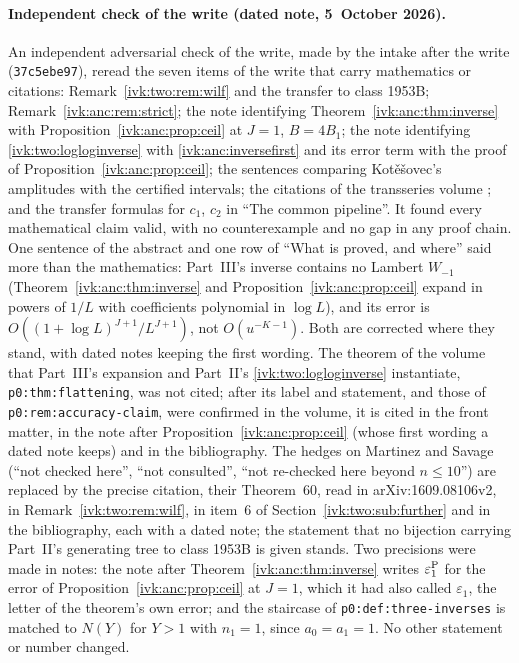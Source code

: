 \documentclass[11pt,letterpaper]{article}
\theoremstyle{remark}\newtheorem{remark}[theorem]{Remark}
\newcommand{\eps}{\varepsilon}
\begin{document}
\paragraph{Independent check of the write (dated note, 5~October 2026).}
An independent adversarial check of the write, made by the intake after the write (\texttt{37c5ebe97}), reread the seven items of the write that carry mathematics or citations: Remark~\ref{ivk:two:rem:wilf} and the transfer to class 1953B; Remark~\ref{ivk:anc:rem:strict}; the note identifying Theorem~\ref{ivk:anc:thm:inverse} with Proposition~\ref{ivk:anc:prop:ceil} at $J=1$, $B=4B_1$; the note identifying \eqref{ivk:two:logloginverse} with \eqref{ivk:anc:inversefirst} and its error term with the proof of Proposition~\ref{ivk:anc:prop:ceil}; the sentences comparing Kot\v{e}\v{s}ovec's amplitudes with the certified intervals; the citations of the transseries volume \cite{tsvol}; and the transfer formulas for $c_1$, $c_2$ in ``The common pipeline''. It found every mathematical claim valid, with no counterexample and no gap in any proof chain. One sentence of the abstract and one row of ``What is proved, and where'' said more than the mathematics: Part~III's inverse contains no Lambert $W_{-1}$ (Theorem~\ref{ivk:anc:thm:inverse} and Proposition~\ref{ivk:anc:prop:ceil} expand in powers of $1/L$ with coefficients polynomial in $\log L$), and its error is $O((1+\log L)^{J+1}/L^{J+1})$, not $O(u^{-K-1})$. Both are corrected where they stand, with dated notes keeping the first wording. The theorem of the volume that Part~III's expansion and Part~II's \eqref{ivk:two:logloginverse} instantiate, \texttt{p0:thm:flattening}, was not cited; after its label and statement, and those of \texttt{p0:rem:accuracy-claim}, were confirmed in the volume, it is cited in the front matter, in the note after Proposition~\ref{ivk:anc:prop:ceil} (whose first wording a dated note keeps) and in the bibliography. The hedges on Martinez and Savage (``not checked here'', ``not consulted'', ``not re-checked here beyond $n\le10$'') are replaced by the precise citation, their Theorem~60, read in arXiv:1609.08106v2, in Remark~\ref{ivk:two:rem:wilf}, in item~6 of Section~\ref{ivk:two:sub:further} and in the bibliography, each with a dated note; the statement that no bijection carrying Part~II's generating tree to class 1953B is given stands. Two precisions were made in notes: the note after Theorem~\ref{ivk:anc:thm:inverse} writes $\eps_1^{\rm P}$ for the error of Proposition~\ref{ivk:anc:prop:ceil} at $J=1$, which it had also called $\eps_1$, the letter of the theorem's own error; and the staircase of \texttt{p0:def:three-inverses} is matched to $N(Y)$ for $Y>1$ with $n_1=1$, since $a_0=a_1=1$. No other statement or number changed.
\end{document}
